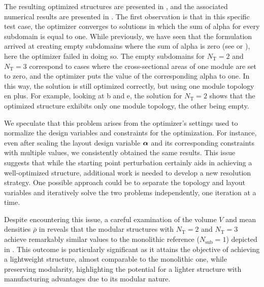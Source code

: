 The resulting optimized structures are presented in , and the associated numerical results are presented in . The first observation is that in this specific test case, the optimizer converges to solutions in which the sum of alpha for every subdomain is equal to one. While previously, we have seen that the formulation arrived at creating empty subdomains where the sum of alpha is zero (see  or ), here the optimizer failed in doing so. The empty subdomains for $N_\text{T}=2$ and $N_\text{T}=3$ correspond to cases where the cross-sectional areas of one module are set to zero, and the optimizer puts the value of the corresponding alpha to one. In this way, the solution is still optimized correctly, but using one module topology en plus. For example, looking at b and e, the solution for $N_\text{T}=2$ shows that the optimized structure exhibits only one module topology, the other being empty.

We speculate that this problem arises from the optimizer's settings used to normalize the design variables and constraints for the optimization. For instance, even after scaling the layout design variable $\bm{\alpha}$ and its corresponding constraints with multiple values, we consistently obtained the same results. This issue suggests that while the starting point perturbation certainly aids in achieving a well-optimized structure, additional work is needed to develop a new resolution strategy. One possible approach could be to separate the topology and layout variables and iteratively solve the two problems independently, one iteration at a time.

Despite encountering this issue, a careful examination of the volume $V$ and mean densities $\bar{\rho}$ in  reveals that the modular structures with $N_\text{T}=2$ and $N_\text{T}=3$ achieve remarkably similar values to the monolithic reference ($N_\text{sub}=1$) depicted in . This outcome is particularly significant as it attains the objective of achieving a lightweight structure, almost comparable to the monolithic one, while preserving modularity, highlighting the potential for a lighter structure with manufacturing advantages due to its modular nature.


